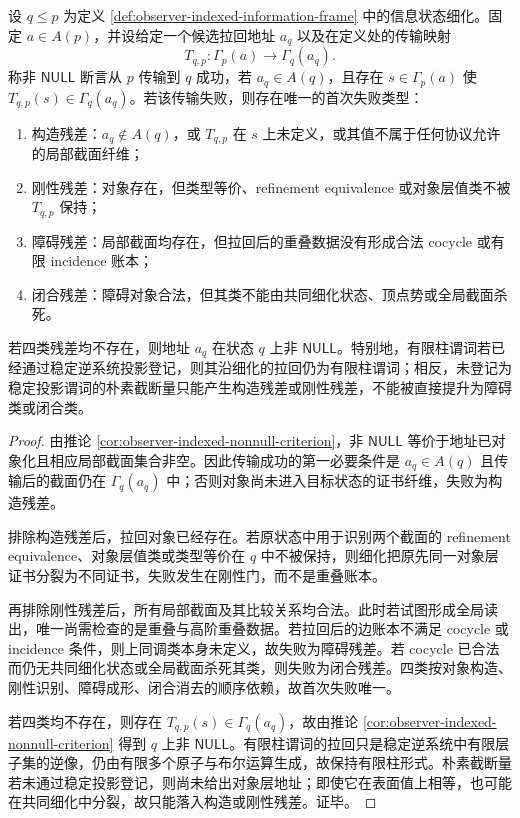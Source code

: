 \begin{proposition}\label{distill:grothendieck-relative_certificate_base_change_stability-observer-refinement-residue-classification}
设 \(q\le p\) 为定义 \ref{def:observer-indexed-information-frame} 中的信息状态细化。固定 \(a\in A(p)\)，并设给定一个候选拉回地址 \(a_q\) 以及在定义处的传输映射
\[
T_{q,p}:\Gamma_p(a)\longrightarrow \Gamma_q(a_q).
\]
称非 \(\mathsf{NULL}\) 断言从 \(p\) 传输到 \(q\) 成功，若 \(a_q\in A(q)\)，且存在 \(s\in\Gamma_p(a)\) 使 \(T_{q,p}(s)\in\Gamma_q(a_q)\)。若该传输失败，则存在唯一的首次失败类型：
\begin{enumerate}
  \item 构造残差：\(a_q\notin A(q)\)，或 \(T_{q,p}\) 在 \(s\) 上未定义，或其值不属于任何协议允许的局部截面纤维；
  \item 刚性残差：对象存在，但类型等价、refinement equivalence 或对象层值类不被 \(T_{q,p}\) 保持；
  \item 障碍残差：局部截面均存在，但拉回后的重叠数据没有形成合法 cocycle 或有限 incidence 账本；
  \item 闭合残差：障碍对象合法，但其类不能由共同细化状态、顶点势或全局截面杀死。
\end{enumerate}
若四类残差均不存在，则地址 \(a_q\) 在状态 \(q\) 上非 \(\mathsf{NULL}\)。特别地，有限柱谓词若已经通过稳定逆系统投影登记，则其沿细化的拉回仍为有限柱谓词；相反，未登记为稳定投影谓词的朴素截断量只能产生构造残差或刚性残差，不能被直接提升为障碍类或闭合类。
\end{proposition}
\begin{proof}
由推论 \ref{cor:observer-indexed-nonnull-criterion}，非 \(\mathsf{NULL}\) 等价于地址已对象化且相应局部截面集合非空。因此传输成功的第一必要条件是 \(a_q\in A(q)\) 且传输后的截面仍在 \(\Gamma_q(a_q)\) 中；否则对象尚未进入目标状态的证书纤维，失败为构造残差。

排除构造残差后，拉回对象已经存在。若原状态中用于识别两个截面的 refinement equivalence、对象层值类或类型等价在 \(q\) 中不被保持，则细化把原先同一对象层证书分裂为不同证书，失败发生在刚性门，而不是重叠账本。

再排除刚性残差后，所有局部截面及其比较关系均合法。此时若试图形成全局读出，唯一尚需检查的是重叠与高阶重叠数据。若拉回后的边账本不满足 cocycle 或 incidence 条件，则上同调类本身未定义，故失败为障碍残差。若 cocycle 已合法而仍无共同细化状态或全局截面杀死其类，则失败为闭合残差。四类按对象构造、刚性识别、障碍成形、闭合消去的顺序依赖，故首次失败唯一。

若四类均不存在，则存在 \(T_{q,p}(s)\in\Gamma_q(a_q)\)，故由推论 \ref{cor:observer-indexed-nonnull-criterion} 得到 \(q\) 上非 \(\mathsf{NULL}\)。有限柱谓词的拉回只是稳定逆系统中有限层子集的逆像，仍由有限多个原子与布尔运算生成，故保持有限柱形式。朴素截断量若未通过稳定投影登记，则尚未给出对象层地址；即使它在表面值上相等，也可能在共同细化中分裂，故只能落入构造或刚性残差。证毕。
\end{proof}


